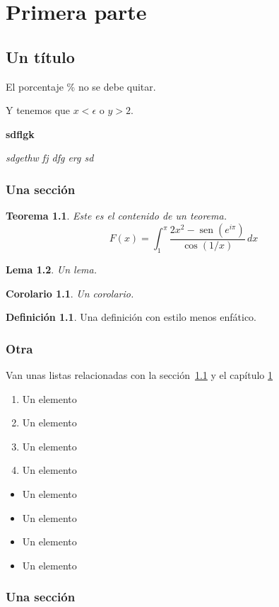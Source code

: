 \documentclass{scrbook}
\newtheorem{theorem}{Teorema}
\newtheorem{lemma}[theorem]{Lema}
\newtheorem{corolario}{Corolario}
\theoremstyle{definition}
\newtheorem{definicion}{Definición}[chapter]
\DeclareMathOperator{\sen}{sen}
\begin{document}
\part{Primera parte}\label{part:etiqueta}

\chapter{Un título}\label{cap:etiqueta} %
El porcentaje \% no se debe quitar. %

Y tenemos que $x<\epsilon$ o $y>2$.

\textbf{sdflgk}

\textit{sdgethw fj dfg erg sd}

\section{Una sección}\label{sec:etiquetaSec1}

\begin{theorem}\label{teo:etiquetaTeo}
Este es el contenido de un teorema.
\begin{equation*}
	F(x)=\int_1^\pi \frac{2x^2 - \sen(e^{i\pi})}{\cos(1/x)}\,dx
\end{equation*}
\end{theorem}

\begin{lemma}\label{lema:etiquetaLema}
Un lema.
\end{lemma}

\begin{corolario}\label{coro:etiquetaCoro}
Un corolario.
\end{corolario}

\begin{definicion}\label{def:etiquetaDef}
Una definición con estilo menos enfático.
\end{definicion}




\section{Otra}\label{sec:Sec3}

Van unas listas relacionadas con la sección~\ref{sec:etiquetaSec1}
y el capítulo \ref{cap:etiqueta}

\begin{enumerate}
\item Un elemento

\item Un elemento

\item Un elemento
\item Un elemento

\end{enumerate}

\begin{itemize}
\item Un elemento

\item Un elemento

\item Un elemento
\item Un elemento

\end{itemize}


\section{Una sección}\label{sec:etiquetaSec2}
\end{document}
